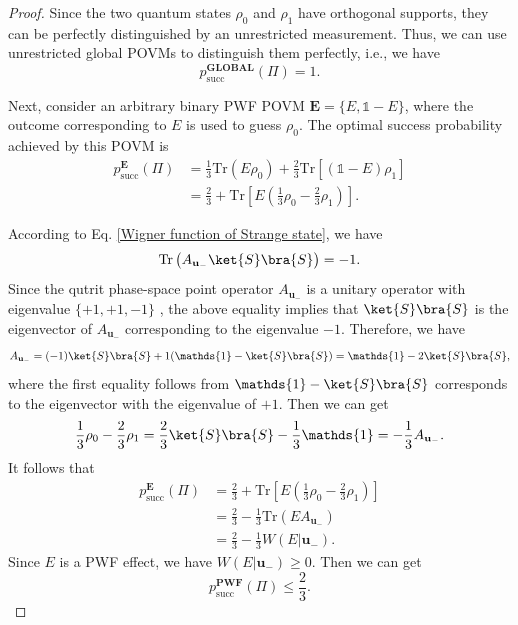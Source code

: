\documentclass[aps,pra,twocolumn,floatfix,amsfonts,10pt]{revtex4-2}
\begin{document}
\begin{proof}
	Since the two quantum states $\rho_0$ and $\rho_1$ have orthogonal supports, they can be perfectly distinguished by an unrestricted measurement. 
	Thus, we can use unrestricted global POVMs to distinguish them perfectly, i.e., we have
	\begin{equation}
		p_{\mathrm{succ}}^{\mathbf{GLOBAL}}(\Pi)=1.
	\end{equation}
	
	Next, consider an arbitrary binary PWF POVM $\mathbf{E} = \{E,\mathds{1}-E\}$, where the outcome corresponding to $E$ is used to guess $\rho_0$.
	The optimal success probability achieved by this POVM is
	\begin{equation}
		\begin{aligned}
			p_{\mathrm{succ}}^{\mathbf{E}}(\Pi) &= \frac{1}{3}\mathrm{Tr}(E\rho_0) + \frac{2}{3}\mathrm{Tr}[(\mathds{1}-E)\rho_1]  \\ &= \frac{2}{3} + \mathrm{Tr} \left[E\left(\frac{1}{3}\rho_0 - \frac{2}{3}\rho_1\right)\right].
		\end{aligned}
	\end{equation}

	According to Eq. \eqref{Wigner function of Strange state}, we have
	\begin{equation}
		\mathrm{Tr}\left(A_{\mathbf{u}_{-}}\ket{S}\bra{S}\right) = -1.
	\end{equation}
	Since the qutrit phase-space point operator $A_{\mathbf{u}_{-}}$ is a unitary operator with eigenvalue $\{+1,+1,-1\}$ \cite{ZLZ+2024}, the above equality implies that $\ket{S}\bra{S}$ is the eigenvector of $A_{\mathbf{u}_{-}}$ corresponding to the eigenvalue $-1$.
	Therefore, we have
	\begin{equation}
		A_{\mathbf{u}_{-}} = (-1)\ket{S}\bra{S} + 1(\mathds{1}-\ket{S}\bra{S}) = \mathds{1}-2\ket{S}\bra{S},
	\end{equation}
	where the first equality follows from $\mathds{1}-\ket{S}\bra{S}$ corresponds to the eigenvector with the eigenvalue of $+1$.
	Then we can get
	\begin{equation}
		\frac{1}{3}\rho_0-\frac{2}{3}\rho_1 = \frac{2}{3}\ket{S}\bra{S}-\frac{1}{3}\mathds{1} = -\frac{1}{3}A_{\mathbf{u}_-}.
	\end{equation}
	It follows that
	\begin{equation}
		\begin{aligned}
			p_{\mathrm{succ}}^{\mathbf{E}}(\Pi) &= \frac{2}{3}+\mathrm{Tr}\left[E\left(\frac{1}{3}\rho_0 - \frac{2}{3}\rho_1\right)\right] \\ &= \frac{2}{3} - \frac{1}{3}\mathrm{Tr}(EA_{\mathbf{u}_-}) \\ &= \frac{2}{3}-\frac{1}{3}W(E|\mathbf{u}_-).
		\end{aligned}
	\end{equation}
	Since $E$ is a PWF effect, we have $W(E|\mathbf{u}_-) \geqslant 0$.
	Then we can get
	\begin{equation}
		p_{\mathrm{succ}}^{\mathbf{PWF}}(\Pi) \leqslant \frac{2}{3}.
	\end{equation}
	

\end{proof}
\end{document}
